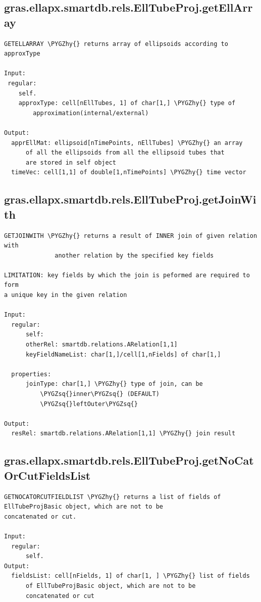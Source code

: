 \documentclass[letterpaper,10pt,english]{sphinxmanual}
\def\PYGZhy{\char`\-}
\def\PYGZsq{\char`\'}
\begin{document}
\subsection{gras.ellapx.smartdb.rels.EllTubeProj.getEllArray}
\label{chap_functions:gras-ellapx-smartdb-rels-elltubeproj-getellarray}
\begin{Verbatim}[commandchars=\\\{\}]
GETELLARRAY \PYGZhy{} returns array of ellipsoids according to
approxType

Input:
 regular:
    self.
    approxType: cell[nEllTubes, 1] of char[1,] \PYGZhy{} type of
        approximation(internal/external)

Output:
  apprEllMat: ellipsoid[nTimePoints, nEllTubes] \PYGZhy{} an array
      of all the ellipsoids from all the ellipsoid tubes that
      are stored in self object
  timeVec: cell[1,1] of double[1,nTimePoints] \PYGZhy{} time vector
\end{Verbatim}


\subsection{gras.ellapx.smartdb.rels.EllTubeProj.getJoinWith}
\label{chap_functions:gras-ellapx-smartdb-rels-elltubeproj-getjoinwith}
\begin{Verbatim}[commandchars=\\\{\}]
GETJOINWITH \PYGZhy{} returns a result of INNER join of given relation with
              another relation by the specified key fields

LIMITATION: key fields by which the join is peformed are required to form
a unique key in the given relation

Input:
  regular:
      self:
      otherRel: smartdb.relations.ARelation[1,1]
      keyFieldNameList: char[1,]/cell[1,nFields] of char[1,]

  properties:
      joinType: char[1,] \PYGZhy{} type of join, can be
          \PYGZsq{}inner\PYGZsq{} (DEFAULT)
          \PYGZsq{}leftOuter\PYGZsq{}

Output:
  resRel: smartdb.relations.ARelation[1,1] \PYGZhy{} join result
\end{Verbatim}


\subsection{gras.ellapx.smartdb.rels.EllTubeProj.getNoCatOrCutFieldsList}
\label{chap_functions:gras-ellapx-smartdb-rels-elltubeproj-getnocatorcutfieldslist}
\begin{Verbatim}[commandchars=\\\{\}]
GETNOCATORCUTFIELDLIST \PYGZhy{} returns a list of fields of
EllTubeProjBasic object, which are not to be
concatenated or cut.

Input:
  regular:
      self.
Output:
  fieldsList: cell[nFields, 1] of char[1, ] \PYGZhy{} list of fields
      of EllTubeProjBasic object, which are not to be
      concatenated or cut
\end{Verbatim}
\end{document}
